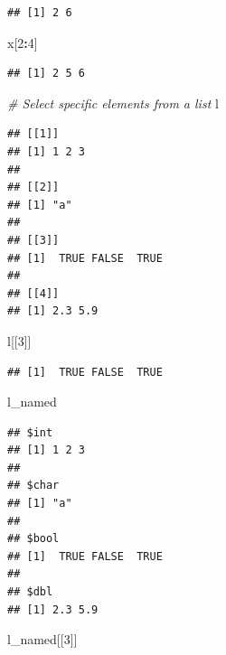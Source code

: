 \documentclass[
]{article}
\newenvironment{Shaded}{\begin{snugshade}}{\end{snugshade}}
\newcommand{\CommentTok}[1]{\textcolor[rgb]{0.56,0.35,0.01}{\textit{#1}}}
\newcommand{\DecValTok}[1]{\textcolor[rgb]{0.00,0.00,0.81}{#1}}
\newcommand{\NormalTok}[1]{#1}
\newcommand{\OperatorTok}[1]{\textcolor[rgb]{0.81,0.36,0.00}{\textbf{#1}}}
\begin{document}
\begin{verbatim}
## [1] 2 6
\end{verbatim}

\begin{Shaded}
\begin{Highlighting}[]
\NormalTok{x[}\DecValTok{2}\OperatorTok{:}\DecValTok{4}\NormalTok{]}
\end{Highlighting}
\end{Shaded}

\begin{verbatim}
## [1] 2 5 6
\end{verbatim}

\begin{Shaded}
\begin{Highlighting}[]
\CommentTok{# Select specific elements from a list}
\NormalTok{l}
\end{Highlighting}
\end{Shaded}

\begin{verbatim}
## [[1]]
## [1] 1 2 3
## 
## [[2]]
## [1] "a"
## 
## [[3]]
## [1]  TRUE FALSE  TRUE
## 
## [[4]]
## [1] 2.3 5.9
\end{verbatim}

\begin{Shaded}
\begin{Highlighting}[]
\NormalTok{l[[}\DecValTok{3}\NormalTok{]]}
\end{Highlighting}
\end{Shaded}

\begin{verbatim}
## [1]  TRUE FALSE  TRUE
\end{verbatim}

\begin{Shaded}
\begin{Highlighting}[]
\NormalTok{l_named}
\end{Highlighting}
\end{Shaded}

\begin{verbatim}
## $int
## [1] 1 2 3
## 
## $char
## [1] "a"
## 
## $bool
## [1]  TRUE FALSE  TRUE
## 
## $dbl
## [1] 2.3 5.9
\end{verbatim}

\begin{Shaded}
\begin{Highlighting}[]
\NormalTok{l_named[[}\DecValTok{3}\NormalTok{]]}
\end{Highlighting}
\end{Shaded}
\end{document}
